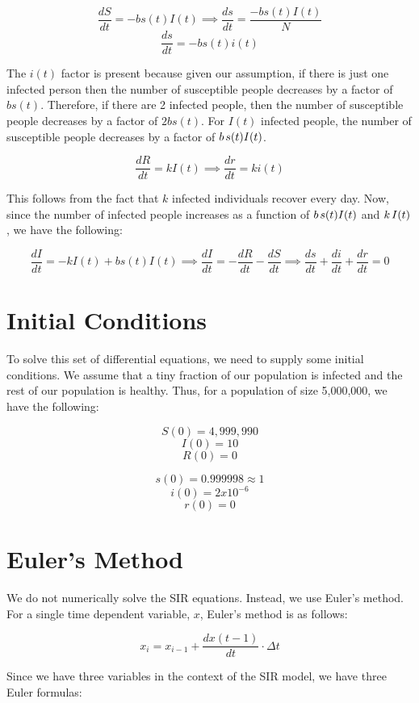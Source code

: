 \documentclass{article}
\begin{document}
\[\frac{dS}{dt} = -b s(t) I(t) \implies \frac{ds}{dt} = \frac{-b s(t) I(t)}{N}\]
\[\frac{ds}{dt} = -b s(t) i(t)\]

\noindent
The $i(t)$ factor is present because given our assumption, if there is just one infected person then the number of susceptible people decreases by a factor of $b s(t)$. Therefore, if there are 2 infected people, then the number of susceptible people decreases by a factor of $2b s(t)$. For $I(t)$ infected people, the number of susceptible people decreases by a factor of $b \hspace{0.5mm} s(t) I(t)$. 

\[\frac{dR}{dt} = k I(t) \implies \frac{dr}{dt} = k i(t)\]

\noindent
This follows from the fact that $k$ infected individuals recover every day. Now, since the number of infected people increases as a function of $b \hspace{0.5mm} s(t) I(t)$ and $k \hspace{0.5mm} I(t)$, we have the following:

\[\frac{dI}{dt} = -k I(t) + b s(t) I(t) \implies \frac{dI}{dt} = -\frac{dR}{dt} - \frac{dS}{dt} \implies \frac{ds}{dt} + \frac{di}{dt} + \frac{dr}{dt} = 0\]

\section{Initial Conditions}
To solve this set of differential equations, we need to supply some initial conditions. We assume that a tiny fraction of our population is infected and the rest of our population is healthy. Thus, for a population of size 5,000,000, we have the following:

\[S(0) = 4,999,990\]
\[I(0) = 10\]
\[R(0) = 0\]

\[s(0) = 0.999998 \approx 1\]
\[i(0) = 2 x 10^{-6}\]
\[r(0) = 0\]

\section{Euler's Method}
We do not numerically solve the SIR equations. Instead, we use Euler's method. For a single time dependent variable, $x$, Euler's method is as follows:

\[x_i = x_{i-1} + \frac{dx(t-1)}{dt} \cdot \Delta t\]

\noindent
Since we have three variables in the context of the SIR model, we have three Euler formulas:
\end{document}

